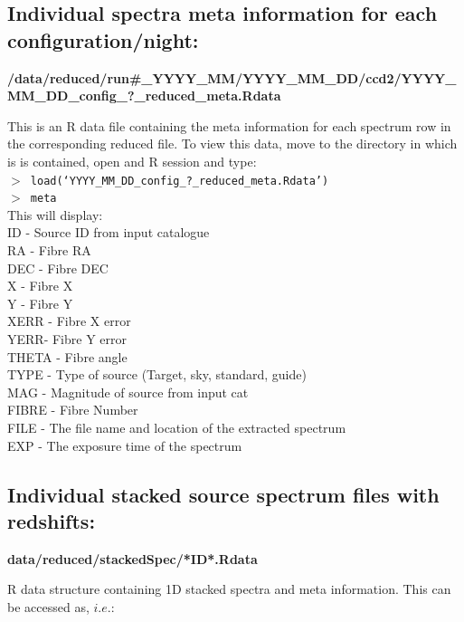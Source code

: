 \documentclass[12pt]{article}
\begin{document}
 \subsection{Individual spectra meta information for each configuration/night:} 
 
  \textbf{/data/reduced/run\#\_YYYY\_MM/YYYY\_MM\_DD/ccd2/YYYY\_MM\_DD\_config\_?\_reduced\_meta.Rdata} 
  
 This is an R data file containing the meta information for each spectrum row in the corresponding reduced file. To view this data, move to the directory in which is is contained, open and R session and type:\\
 

\hspace{10mm}  \texttt{$>$ load(`YYYY\_MM\_DD\_config\_?\_reduced\_meta.Rdata')}\\

\hspace{10mm}  \texttt{$>$ meta}\\

This will display:\\

ID - Source ID from input catalogue    \\
RA - Fibre RA \\
DEC - Fibre DEC \\
X - Fibre X \\
Y - Fibre Y \\
XERR - Fibre X error \\
YERR- Fibre Y error\\
THETA - Fibre angle \\
TYPE - Type of source (Target, sky, standard, guide)\\
MAG - Magnitude of source from input cat\\
FIBRE - Fibre Number\\
FILE - The file name and location of the extracted spectrum \\
EXP - The exposure time of the spectrum \\

 \subsection{Individual stacked source spectrum files with redshifts:}
 
  \textbf{data/reduced/stackedSpec/*ID*.Rdata} 
  
  R data structure containing 1D stacked spectra and meta information. This can be accessed as, $i.e.$:
  
\end{document}
